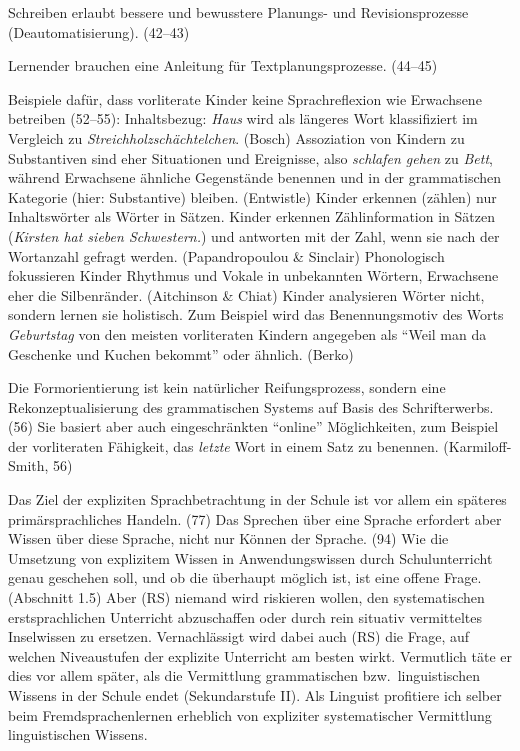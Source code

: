 Schreiben erlaubt bessere und bewusstere Planungs- und Revisionsprozesse (Deautomatisierung). (42--43)

Lernender brauchen eine Anleitung für Textplanungsprozesse. (44--45)

Beispiele dafür, dass vorliterate Kinder keine Sprachreflexion wie Erwachsene betreiben (52--55):
Inhaltsbezug: \textit{Haus} wird als längeres Wort klassifiziert im Vergleich zu \textit{Streichholzschächtelchen}. (Bosch)
Assoziation von Kindern zu Substantiven sind eher Situationen und Ereignisse, also \textit{schlafen gehen} zu \textit{Bett}, während Erwachsene ähnliche Gegenstände benennen und in der grammatischen Kategorie (hier: Substantive) bleiben. (Entwistle)
Kinder erkennen (zählen) nur Inhaltswörter als Wörter in Sätzen.
Kinder erkennen Zählinformation in Sätzen (\textit{Kirsten hat sieben Schwestern.}) und antworten mit der Zahl, wenn sie nach der Wortanzahl gefragt werden. (Papandropoulou \& Sinclair)
Phonologisch fokussieren Kinder Rhythmus und Vokale in unbekannten Wörtern, Erwachsene eher die Silbenränder. (Aitchinson \& Chiat)
Kinder analysieren Wörter nicht, sondern lernen sie holistisch. Zum Beispiel wird das Benennungsmotiv des Worts \textit{Geburtstag} von den meisten vorliteraten Kindern angegeben als "`Weil man da Geschenke und Kuchen bekommt"' oder ähnlich. (Berko)

Die Formorientierung ist kein natürlicher Reifungsprozess, sondern eine Rekonzeptualisierung des grammatischen Systems auf Basis des Schrifterwerbs. (56)
Sie basiert aber auch eingeschränkten "`online"' Möglichkeiten, zum Beispiel der vorliteraten Fähigkeit, das \textit{letzte} Wort in einem Satz zu benennen. (Karmiloff-Smith, 56)

Das Ziel der expliziten Sprachbetrachtung in der Schule ist vor allem ein späteres primärsprachliches Handeln. (77)
Das Sprechen über eine Sprache erfordert aber Wissen über diese Sprache, nicht nur Können der Sprache. (94)
Wie die Umsetzung von explizitem Wissen in Anwendungswissen durch Schulunterricht genau geschehen soll, und ob die überhaupt möglich ist, ist eine offene Frage. (Abschnitt 1.5) Aber (RS) niemand wird riskieren wollen, den systematischen erstsprachlichen Unterricht abzuschaffen oder durch rein situativ vermitteltes Inselwissen zu ersetzen. Vernachlässigt wird dabei auch (RS) die Frage, auf welchen Niveaustufen der explizite Unterricht am besten wirkt. Vermutlich täte er dies vor allem später, als die Vermittlung grammatischen bzw.\ linguistischen Wissens in der Schule endet (Sekundarstufe II). Als Linguist profitiere ich selber \zB beim Fremdsprachenlernen erheblich von expliziter systematischer Vermittlung linguistischen Wissens.

